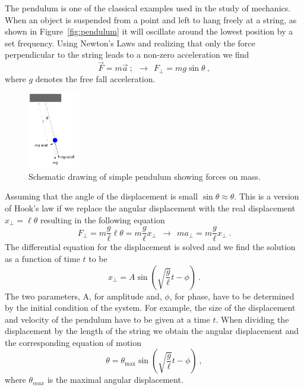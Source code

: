 \documentclass[10pt,aps,twocolumn,secnumarabic,balancelastpage,amsmath,amssymb,nofootinbib,floatfix]{revtex4}
\begin{document}
The pendulum is one of the classical examples used in the study of mechanics. When an object is suspended from a point and left to hang freely at a string, as shown in Figure~\ref{fig:pendulum} it will oscillate around the lowest position by a set frequency. Using Newton's Laws and realizing that only the force perpendicular to the string leads to a non-zero acceleration we find
%
\begin{equation}
  \vec{F} = m \vec{a} \ ; ~~ \to ~~ F_{\perp} = m g \sin\theta \ ,
\end{equation}
%
where $g$ denotes the free fall acceleration.
%
\begin{figure}[!h]
\centering\includegraphics[width=0.2\textwidth]{figs/pendulum.pdf}
\caption{\label{fig:pendulum} Schematic drawing of simple pendulum showing forces on mass.}
\label{spend}
\end{figure}
%
Assuming that the angle of the displacement is small $\sin\theta \approx \theta$. This is a version of Hook's law if we replace the angular displacement with the real displacement $x_\perp = \ell \theta$ resulting in the following equation
%
\begin{equation}
  F_{\perp} = m\frac{g}{\ell} \ell\theta = m\frac{g}{\ell} x_\perp
  ~~\to~~
  m a_\perp = m\frac{g}{\ell} x_\perp \ .
\end{equation}
%
The differential equation for the displacement is solved and we find the solution as a function of time $t$ to be
%
\begin{equation}
  x_\perp = A \sin \left( \sqrt{ \frac{g}{\ell} } t - \phi \right) \ .
\end{equation}
%
The two parameters, A, for amplitude and, $\phi$, for phase, have to be determined by the initial condition of the system. For example, the size of the displacement and velocity of the pendulum have to be given at a time $t$.
%
When dividing the displacement by the length of the string we obtain the angular displacement and the corresponding equation of motion
%
\begin{equation}\label{eq:theta_of_t}
  \theta = \theta_\text{max} \sin \left( \sqrt{ \frac{g}{\ell} } t - \phi \right) \ ,
\end{equation}
%
where $\theta_{max}$ is the maximal angular displacement.
\end{document}
